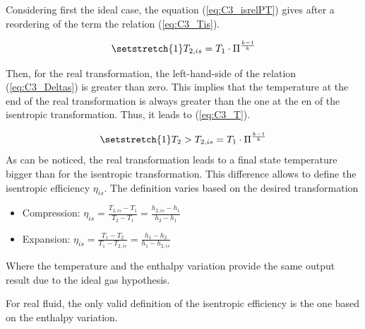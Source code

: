 Considering first the ideal case, the equation (\ref{eq:C3_isrelPT}) gives after a reordering of the term the relation (\ref{eq:C3_Tis}).

\begin{equation}
\setstretch{1}
T_{2,is} = T_1\cdot\Pi^\frac{k-1}{k}\label{eq:C3_Tis}
\end{equation}

Then, for the real transformation, the left-hand-side of the relation (\ref{eq:C3_Deltas}) is greater than zero. This implies that the temperature at the end of the real transformation is always greater than the one at the en of the isentropic transformation. Thus, it leads to (\ref{eq:C3_T}).

\begin{equation}
\setstretch{1}
T_{2} > T_{2,is} = T_1\cdot\Pi^\frac{k-1}{k}\label{eq:C3_T}
\end{equation}
As can be noticed, the real transformation leads to a final state temperature bigger than for the isentropic transformation. This difference allows to define the isentropic efficiency $\eta_{is}$. The definition varies based on the desired transformation
\begin{itemize}
\item Compression: $\eta_{is}=\frac{T_{2,is}-T_1}{T_2-T_1}=\frac{h_{2,is}-h_1}{h_2-h_1}$
\item Expansion: $\eta_{is}=\frac{T_1-T_{2}}{T_1-T_{2,is}}=\frac{h_1-h_{2}}{h_1-h_{2,is}}$
\end{itemize}
Where the temperature and the enthalpy variation provide the same output result due to the ideal gas hypothesis. 

For real fluid, the only valid definition of the isentropic efficiency is the one based on the enthalpy variation. 

%

